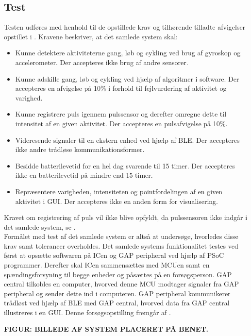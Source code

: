 \subsection{Test}
Testen udføres med henhold til de opstillede krav og tilhørende tilladte afvigelser opstillet i . Kravene beskriver, at det samlede system skal:
\begin{itemize}
	\item Kunne detektere aktiviteterne gang, løb og cykling ved brug af gyroskop og accelerometer. Der accepteres ikke brug af andre sensorer.
	\item Kunne adskille gang, løb og cykling ved hjælp af algoritmer i software. Der accepteres en afvigelse på 10\% i forhold til fejlvurdering af aktivitet og varighed.
	\item Kunne registrere puls igennem pulssensor og derefter omregne dette til intensitet af en given aktivitet. Der accepteres en pulsafvigelse på 10\%.
	\item Videresende signaler til en ekstern enhed ved hjælp af BLE. Der accepteres ikke andre trådløse kommunikationsformer.
	\item Besidde batterilevetid for en hel dag svarende til 15 timer. Der accepteres ikke en batterilevetid på mindre end 15 timer.
	\item Repræsentere varigheden, intensiteten og pointfordelingen af en given aktivitet i GUI. Der accepteres ikke en anden form for visualisering. 
\end{itemize}
Kravet om registrering af puls vil ikke blive opfyldt, da pulssensoren ikke indgår i det samlede system, se . \\
Formålet med test af det samlede system er altså at undersøge, hvorledes disse krav samt tolerancer overholdes. Det samlede systems funktionalitet testes ved først at opsætte softwaren på ICen og GAP peripheral ved hjælp af PSoC programmer. Derefter skal ICen sammensættes med MCUen samt en spændingsforsyning til begge enheder og påsættes på en forsøgsperson. GAP central tilkobles en computer, hvorved denne MCU modtager signaler fra GAP peripheral og sender dette ind i computeren. GAP peripheral kommunikerer trådløst ved hjælp af BLE med GAP central, hvorved data fra GAP central illustreres i en GUI. Denne forsøgsopstilling fremgår af .

\textbf{FIGUR: BILLEDE AF SYSTEM PLACERET PÅ BENET.} \\

